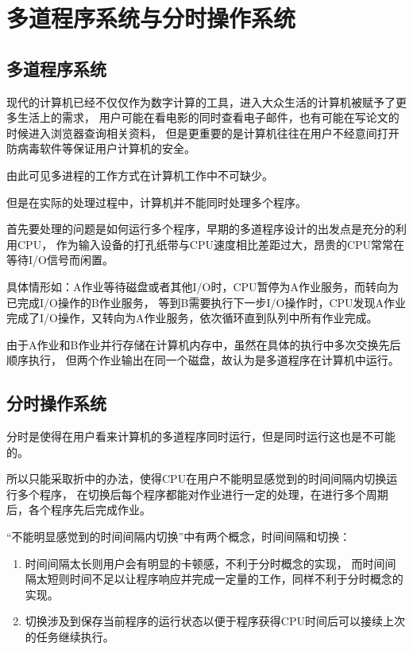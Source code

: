 
\section{多道程序系统与分时操作系统}

\subsection{多道程序系统}

现代的计算机已经不仅仅作为数字计算的工具，进入大众生活的计算机被赋予了更多生活上的需求，
用户可能在看电影的同时查看电子邮件，也有可能在写论文的时候进入浏览器查询相关资料，
但是更重要的是计算机往往在用户不经意间打开防病毒软件等保证用户计算机的安全。

由此可见多进程的工作方式在计算机工作中不可缺少。

但是在实际的处理过程中，计算机并不能同时处理多个程序。

首先要处理的问题是如何运行多个程序，早期的多道程序设计的出发点是充分的利用CPU，
作为输入设备的打孔纸带与CPU速度相比差距过大，昂贵的CPU常常在等待I/O信号而闲置。

具体情形如：A作业等待磁盘或者其他I/O时，CPU暂停为A作业服务，而转向为已完成I/O操作的B作业服务，
等到B需要执行下一步I/O操作时，CPU发现A作业完成了I/O操作，又转向为A作业服务，依次循环直到队列中所有作业完成。

由于A作业和B作业并行存储在计算机内存中，虽然在具体的执行中多次交换先后顺序执行，
但两个作业输出在同一个磁盘，故认为是多道程序在计算机中运行。

\subsection{分时操作系统}

分时是使得在用户看来计算机的多道程序同时运行，但是同时运行这也是不可能的。

所以只能采取折中的办法，使得CPU在用户不能明显感觉到的时间间隔内切换运行多个程序，
在切换后每个程序都能对作业进行一定的处理，在进行多个周期后，各个程序先后完成作业。

“不能明显感觉到的时间间隔内切换”中有两个概念，时间间隔和切换：

\begin{enumerate}
\item 时间间隔太长则用户会有明显的卡顿感，不利于分时概念的实现，
  而时间间隔太短则时间不足以让程序响应并完成一定量的工作，同样不利于分时概念的实现。
\item 切换涉及到保存当前程序的运行状态以便于程序获得CPU时间后可以接续上次的任务继续执行。
\end{enumerate}

